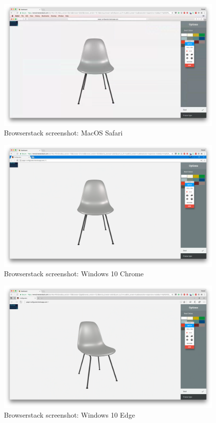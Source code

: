 \clearpage

\begin{figure}
\includegraphics[width=15cm]{images/deviceScreenshots/MacOSSafari}
\caption{Browserstack screenshot: MacOS Safari}
\label{attachment:MacOSSafari}
\end{figure}

\begin{figure}
\includegraphics[width=15cm]{images/deviceScreenshots/Windows10Chrome}
\caption{Browserstack screenshot: Windows 10 Chrome}
\label{attachment:Windows10Chrome}
\end{figure}

\clearpage

\begin{figure}
\includegraphics[width=15cm]{images/deviceScreenshots/Windows10Edge}
\caption{Browserstack screenshot: Windows 10 Edge}
\label{attachment:Windows10Edge}
\end{figure}

